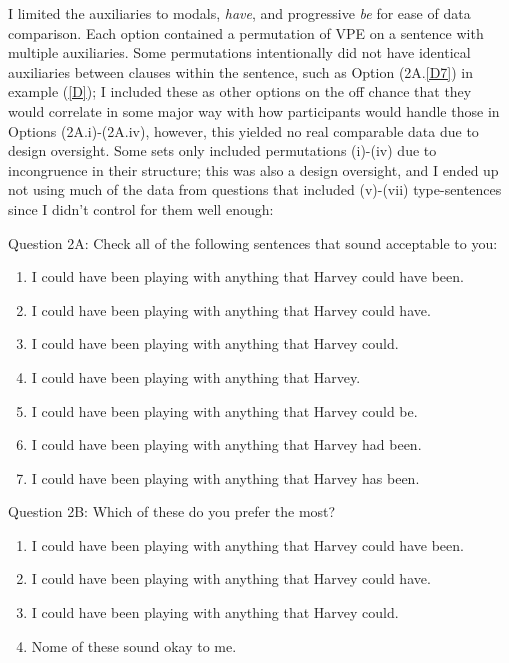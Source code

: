 \documentclass[11pt, oneside]{article}
\begin{document}
I limited the auxiliaries to modals, \textit{have}, and progressive \textit{be} for ease of data comparison. Each option contained a permutation of VPE on a sentence with multiple auxiliaries. Some permutations intentionally did not have identical auxiliaries between clauses within the sentence, such as Option (2A.\ref{D7}) in example (\ref{D}); I included these as other options on the off chance that they would correlate in some major way with how participants would handle those in Options (2A.i)-(2A.iv), however, this yielded no real comparable data due to design oversight. Some sets only included permutations (i)-(iv) due to incongruence in their structure; this was also a design oversight, and I ended up not using much of the data from questions that included (v)-(vii) type-sentences since I didn't control for them well enough:

\begin{exe}
\ex\samepage\label{exmplq}\label{D} 	\begin{xlist}
	\ex Question 2A: Check all of the following sentences that sound acceptable to you:\begin{enumerate}[i]
	\item I could have been playing with anything that Harvey could have been.
	\item I could have been playing with anything that Harvey could have.
	\item I could have been playing with anything that Harvey could.
	\item I could have been playing with anything that Harvey.
	\item I could have been playing with anything that Harvey could be.
	\item I could have been playing with anything that Harvey had been.
	\item\label{D7} I could have been playing with anything that Harvey has been.
	\end{enumerate}
	\ex\samepage Question 2B: Which of these do you prefer the most?\begin{enumerate}[i]
	\item I could have been playing with anything that Harvey could have been.
	\item I could have been playing with anything that Harvey could have.
	\item I could have been playing with anything that Harvey could.
	\item Nome of these sound okay to me.
	\end{enumerate}
	\end{xlist}
\end{exe}
\end{document}
